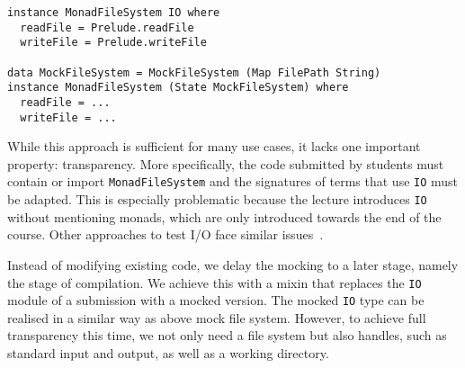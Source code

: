 \begin{verbatim}
instance MonadFileSystem IO where
  readFile = Prelude.readFile
  writeFile = Prelude.writeFile

data MockFileSystem = MockFileSystem (Map FilePath String)
instance MonadFileSystem (State MockFileSystem) where
  readFile = ...
  writeFile = ...
\end{verbatim}
While this approach is sufficient for many use cases,
it lacks one important property: transparency.
More specifically, the code submitted by students must contain or import \texttt{MonadFileSystem} and the signatures of terms that use \texttt{IO} must be adapted.
This is especially problematic because the lecture introduces \texttt{IO} without mentioning monads,
which are only introduced towards the end of the course.
Other approaches to test I/O
face similar issues~\cite{iotest1,iotest2}.

Instead of modifying existing code,
we delay the mocking to a later stage,
namely the stage of compilation.
We achieve this with a mixin that replaces the \texttt{IO} module of a submission with a mocked version.
The mocked \texttt{IO} type can be realised in a similar way as above mock file system.
However, to achieve full transparency this time,
we not only need a file system but also handles, such as standard input and output, as well as a working directory.

